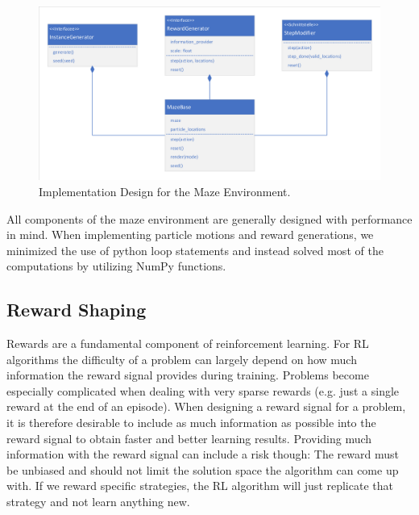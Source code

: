 \begin{figure}[ht]
    
    \begin{center}
        \includegraphics[clip, trim=10px 10px 10px 10px, width=0.9\columnwidth]{figures/implementation/maze_base_design.pdf}
    \end{center}
    
    \caption[Implementation Design for the Maze Environment]{Implementation Design for the Maze Environment.}
    \label{fig:MazeBaseDesign}
  \end{figure}

All components of the maze environment are generally designed with performance in mind. When implementing particle motions and reward generations, we minimized the use of python loop statements and instead solved most of the computations by utilizing NumPy \cite{oliphant2006guide} functions.

\subsection{Reward Shaping} \label{sec:MazeReward}
Rewards are a fundamental component of reinforcement learning. For RL algorithms the difficulty of a problem can largely depend on how much information the reward signal provides during training. Problems become especially complicated when dealing with very sparse rewards (e.g. just a single reward at the end of an episode). When designing a reward signal for a problem, it is therefore desirable to include as much information as possible into the reward signal to obtain faster and better learning results. Providing much information with the reward signal can include a risk though: The reward must be unbiased and should not limit the solution space the algorithm can come up with. If we reward specific strategies, the RL algorithm will just replicate that strategy and not learn anything new.

